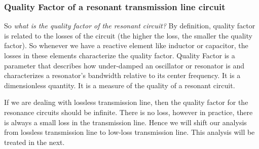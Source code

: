 \subsubsection{Quality Factor of a resonant transmission line circuit}
So \emph{what is the quality factor of the resonant circuit?} By definition, quality factor is related to the losses of the circuit (the higher the loss, the smaller the quality factor). So whenever we have a reactive element like inductor or capacitor, the losses in these elements characterize the quality factor. Quality Factor is a parameter that describes how under-damped an oscillator or resonator is and characterizes a resonator's bandwidth relative to its center frequency. It is a dimensionless quantity. It is a measure of the quality of a resonant circuit. 

If we are dealing with lossless transmission line, then the quality factor for the resonance circuits should be infinite. There is no loss, however in practice, there is always a small loss in the transmission line. Hence we will shift our analysis from lossless transmission line to low-loss transmission line. This analysis will be treated in the next.
